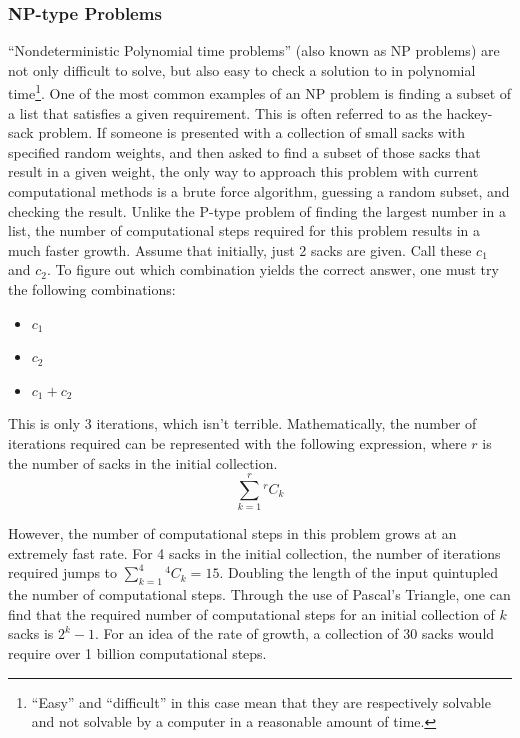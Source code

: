\documentclass[10pt,journal,compsoc]{IEEEtran}
\newcommand*{\Comb}[2]{{}^{#1}C_{#2}}%
\begin{document}
\subsubsection{NP-type Problems}
 ``Nondeterministic Polynomial time problems'' (also known as NP problems) are not only difficult to solve, but also easy to check a solution to in polynomial time\footnote{``Easy'' and ``difficult'' in this case mean that they are respectively solvable and not solvable by a computer in a reasonable amount of time.}. One of the most common examples of an NP problem is finding a subset of a list that satisfies a given requirement. This is often referred to as the hackey-sack problem. If someone is presented with a collection of small sacks with specified random weights, and then asked to find a subset of those sacks that result in a given weight, the only way to approach this problem with current computational methods is a brute force algorithm, guessing a random subset, and checking the result. Unlike the P-type problem of finding the largest number in a list, the number of computational steps required for this problem results in a much faster growth. Assume that initially, just 2 sacks are given. Call these $c_1$ and $c_2$. To figure out which combination yields the correct answer, one must try the following combinations:
\begin{itemize}
	\item $c_1$
	\item $c_2$
	\item $c_1+c_2$
\end{itemize}
This is only 3 iterations, which isn't terrible. Mathematically, the number of iterations required can be represented with the following expression, where $r$ is the number of sacks in the initial collection. $$\sum_{k=1}^{r} \Comb{r}{k} $$ 

However, the number of computational steps in this problem grows at an extremely fast rate. For 4 sacks in the initial collection, the number of iterations required jumps to $\sum_{k=1}^{4} \Comb{4}{k} = 15$. Doubling the length of the input quintupled the number of computational steps. Through the use of Pascal's Triangle, one can find that the required number of computational steps for an initial collection of $k$ sacks is $2^k-1$. For an idea of the rate of growth, a collection of 30 sacks would require over 1 billion computational steps. \\
\end{document}

